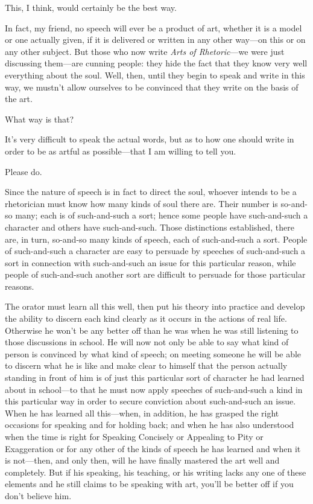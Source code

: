 \sayphaedrus This, I think, would certainly be the best way.

\saysocrates In fact, my friend, no speech will ever be a product of art,
whether it is a model or one actually given, if it is delivered or
written in any other way---on this or on any other subject. But
those who now write {\em Arts of Rhetoric}---we were just discussing
them---are cunning people: they hide the fact that they know very well
everything about the soul. Well, then, until they begin to speak and
write in this way, we mustn't allow ourselves to be convinced that they
write on the basis of the art.

\sayphaedrus What way is that?

\saysocrates It's very difficult to speak the actual words, but as to how
one should write in order to be as artful as possible---that I am
willing to tell you.

\sayphaedrus Please do.

\saysocrates Since the nature of speech is in fact to direct the
soul, whoever intends to be a rhetorician must know how many kinds of
soul there are. Their number is so-and-so many; each is of such-and-such
a sort; hence some people have such-and-such a character and others have
such-and-such. Those distinctions established, there are, in turn,
so-and-so many kinds of speech, each of such-and-such a sort. People of
such-and-such a character are easy to persuade by speeches of
such-and-such a sort in connection with such-and-such an issue for this
particular reason, while people of such-and-such another sort are
difficult to persuade for those particular reasons.

The orator must learn all this well, then put his theory into practice
and develop the ability to discern each kind clearly as it
occurs in the actions of real life. Otherwise he won't be any better off
than he was when he was still listening to those discussions in school.
He will now not only be able to say what kind of person is convinced by
what kind of speech; on meeting someone he will be able
to discern what he is like and make clear to himself that the person
actually standing in front of him is of just this particular sort of
character he had learned about in school---to that he must now apply
speeches of such-and-such a kind in this particular way in order to
secure conviction about such-and-such an issue. When he has learned all
this---when, in addition, he has grasped the right occasions for
speaking and for holding back; and when he has also understood when the
time is right for Speaking Concisely or Appealing to Pity or
Exaggeration or for any other of the kinds of speech he has learned and
when it is not---then, and only then, will he have finally mastered the
art well and completely. But if his speaking, his teaching, or his
writing lacks any one of these elements and he still claims to
be speaking with art, you'll be better off if you don't believe him.

